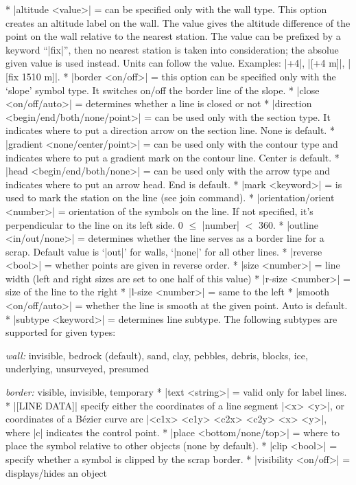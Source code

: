 \comopt
   * |altitude <value>| = can be specified only with the wall type.
         This option creates an altitude label on the wall. The value
         gives the altitude difference of the point on the wall 
         relative to the nearest station. The value can be prefixed
         by a keyword ``|fix|'', then no nearest station is taken into
         consideration; the absolue given value is used instead.
         Units can follow the value. Examples: |+4|, |[+4 m]|,
         |[fix 1510 m]|.
       * |border <on/off>| = this option can be specified only with
         the `slope' symbol type. It switches on/off the border line of the slope.
       * |close <on/off/auto>| = determines whether a line is closed 
         or not
       * |direction <begin/end/both/none/point>| = can be used only
         with the section type. It indicates where to put 
         a direction arrow on the section line. None is default.
       * |gradient <none/center/point>| = can be used only with the contour
         type and indicates where to put a gradient mark on the contour line.
         Center is default.
       * |head <begin/end/both/none>| = can be used only with the arrow
         type and indicates where to put an arrow head. End is default.
       * |mark <keyword>| = is used to mark the station on the line (see
         join command).
       * |orientation/orient <number>| = orientation of the symbols
         on the line. If not specified, it's perpendicular to the 
         line on its left side. 0 $\le$ |number| $<$ 360.
       * |outline <in/out/none>| = determines whether the line serves as
         a border line for a scrap. Default value is `|out|' for
         walls, `|none|' for all other lines.
       * |reverse <bool>| = whether points are given in reverse order.
       * |size <number>| = line width (left and right sizes are set to 
         one half of this value)
       * |r-size <number>| = size of the line to the right
       * |l-size <number>| = same to the left
       * |smooth <on/off/auto>| = whether the line is smooth at the given point.
         Auto is default.
       * |subtype <keyword>| = determines line subtype. The following
         subtypes are supported for given types:  

         {\it wall:} invisible, bedrock (default), sand, clay, pebbles, debris,
         blocks, ice, underlying, unsurveyed, presumed  

         {\it border:} visible, invisible, temporary
       * |text <string>| = valid only for label lines.
       * |[LINE DATA]| specify either the coordinates of a line segment
         |<x> <y>|, or coordinates of a B\'ezier curve arc 
         |<c1x> <c1y> <c2x> <c2y> <x> <y>|, where |c| indicates the control
         point.
       * |place <bottom/none/top>| = where to place the symbol relative
         to other objects (none by default).
       * |clip <bool>| = specify whether a symbol is clipped by the scrap border.
       * |visibility <on/off>| = displays/hides an object
\endcomopt

